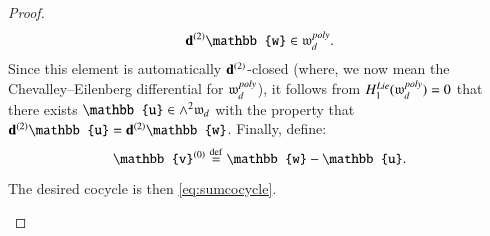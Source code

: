 \documentclass[main.tex]{subfiles}
\begin{document}
\begin{proof}
    \begin{equation}\label{}
      \bd^{(2)} \mathbb{w} \in \lie{w}^{poly}_d . 
    \end{equation}
    Since this element is automatically $\mathbf d^{(2)}$-closed (where, we now mean the Chevalley--Eilenberg differential for
    $\mathfrak{w}_d^{poly}$), it follows from $H_1^{Lie}(\mathfrak{w}^{poly}_d) = 0$
    that there exists $\mathbb{u} \in \wedge^2 \lie{w}_d$ with the property that $\bd^{(2)} \mathbb{u} =
    \bd^{(2)} \mathbb{w}$.
    Finally, define:
    \begin{equation}\label{}
      \mathbb{v}^{(0)} \define \mathbb{w} - \mathbb{u} .
    \end{equation}
    The desired cocycle is then \eqref{eq:sumcocycle}.
    \begin{figure}[htbp]
        \centering


\begin{tikzpicture}[x=0.75pt,y=0.75pt,yscale=-1,xscale=1]


\end{tikzpicture}
\end{figure}
\end{proof}
\end{document}
